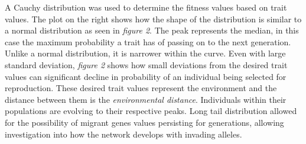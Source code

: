 A Cauchy distribution was used to determine the fitness values based on trait values. The plot on the right shows how the shape of the distribution is similar to a normal distribution as seen in \textit{figure 2}. The peak represents the median, in this case the maximum probability a trait has of passing on to the next generation. Unlike a normal distribution, it is narrower within the curve. Even with large standard deviation, \textit{figure 2} shows how small deviations from the desired trait values can significant decline in probability of an individual being selected for reproduction. These desired trait values represent the environment and the distance between them is the \textit{environmental distance}. Individuals within their populations are evolving to their respective peaks. Long tail distribution allowed for the possibility of migrant genes values persisting for generations, allowing investigation into how the network develops with invading alleles.
